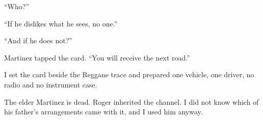 “Who?”\par

“If he dislikes what he sees, no one.”\par

“And if he does not?”\par

Martinez tapped the card. “You will receive the next road.”\par

I set the card beside the Reggane trace and prepared one vehicle, one driver, no radio and no instrument case.\par

The elder Martinez is dead. Roger inherited the channel. I did not know which of his father's arrangements came with it, and I used him anyway.\par

